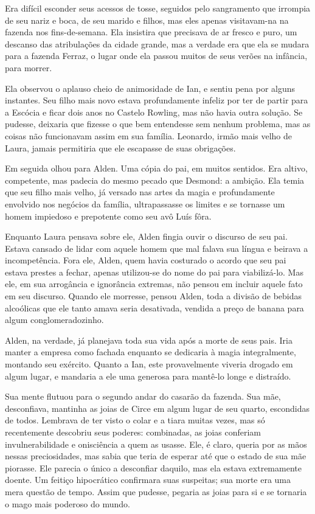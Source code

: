 Era difícil esconder seus acessos de tosse, seguidos pelo sangramento que
irrompia de seu nariz e boca, de seu marido e filhos, mas eles apenas
visitavam-na na fazenda nos fins-de-semana. Ela insistira que precisava de ar
fresco e puro, um descanso das atribulações da cidade grande, mas a verdade era
que ela se mudara para a fazenda Ferraz, o lugar onde ela passou muitos de seus
verões na infância, para morrer.

Ela observou o aplauso cheio de animosidade de Ian, e sentiu pena por alguns
instantes. Seu filho mais novo estava profundamente infeliz por ter de partir
para a Escócia e ficar dois anos no Castelo Rowling, mas não havia outra
solução. Se pudesse, deixaria que fizesse o que bem entendesse sem nenhum
problema, mas as coisas não funcionavam assim em sua família. Leonardo, irmão
mais velho de Laura, jamais permitiria que ele escapasse de suas obrigações.

Em seguida olhou para Alden. Uma cópia do pai, em muitos sentidos. Era altivo,
competente, mas padecia do mesmo pecado que Desmond: a ambição. Ela temia que
seu filho mais velho, já versado nas artes da magia e profundamente envolvido
nos negócios da família, ultrapassasse os limites e se tornasse um homem
impiedoso e prepotente como seu avô Luís fôra.

Enquanto Laura pensava sobre ele, Alden fingia ouvir o discurso de seu pai.
Estava cansado de lidar com aquele homem que mal falava sua língua e beirava a
incompetência. Fora ele, Alden, quem havia costurado o acordo que seu pai
estava prestes a fechar, apenas utilizou-se do nome do pai para viabilizá-lo.
Mas ele, em sua arrogância e ignorância extremas, não pensou em incluir aquele
fato em seu discurso. Quando ele morresse, pensou Alden, toda a divisão de
bebidas alcoólicas que ele tanto amava seria desativada, vendida a preço de
banana para algum conglomeradozinho.

Alden, na verdade, já planejava toda sua vida após a morte de seus pais. Iria
manter a empresa como fachada enquanto se dedicaria à magia integralmente,
montando seu exército. Quanto a Ian, este provavelmente viveria drogado em
algum lugar, e mandaria a ele uma generosa para mantê-lo longe e distraído.

Sua mente flutuou para o segundo andar do casarão da fazenda. Sua mãe,
desconfiava, mantinha as joias de Circe em algum lugar de seu quarto,
escondidas de todos. Lembrava de ter visto o colar e a tiara muitas vezes, mas
só recentemente descobriu seus poderes: combinadas, as joias conferiam
invulnerabilidade e onisciência a quem as usasse. Ele, é claro, queria por as
mãos nessas preciosidades, mas sabia que teria de esperar até que o estado de
sua mãe piorasse. Ele parecia o único a desconfiar daquilo, mas ela estava
extremamente doente. Um feitiço hipocrático confirmara suas suspeitas; sua
morte era uma mera questão de tempo. Assim que pudesse, pegaria as joias para
si e se tornaria o mago mais poderoso do mundo.

